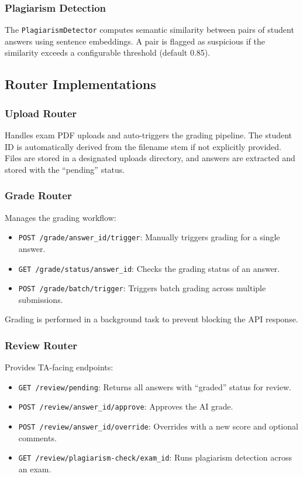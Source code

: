 \documentclass[11pt,a4paper]{article}
\begin{document}
\subsubsection{Plagiarism Detection}
The \texttt{PlagiarismDetector} computes semantic similarity between pairs of student answers using sentence embeddings. A pair is flagged as suspicious if the similarity exceeds a configurable threshold (default 0.85).

\subsection{Router Implementations}

\subsubsection{Upload Router}
Handles exam PDF uploads and auto-triggers the grading pipeline. The student ID is automatically derived from the filename stem if not explicitly provided. Files are stored in a designated uploads directory, and answers are extracted and stored with the ``pending'' status.

\subsubsection{Grade Router}
Manages the grading workflow:

\begin{itemize}[leftmargin=2em]
    \item \texttt{POST /grade/{answer\_id}/trigger}: Manually triggers grading for a single answer.
    \item \texttt{GET /grade/status/{answer\_id}}: Checks the grading status of an answer.
    \item \texttt{POST /grade/batch/trigger}: Triggers batch grading across multiple submissions.
\end{itemize}

Grading is performed in a background task to prevent blocking the API response.

\subsubsection{Review Router}
Provides TA-facing endpoints:

\begin{itemize}[leftmargin=2em]
    \item \texttt{GET /review/pending}: Returns all answers with ``graded'' status for review.
    \item \texttt{POST /review/{answer\_id}/approve}: Approves the AI grade.
    \item \texttt{POST /review/{answer\_id}/override}: Overrides with a new score and optional comments.
    \item \texttt{GET /review/plagiarism-check/{exam\_id}}: Runs plagiarism detection across an exam.
\end{itemize}
\end{document}
